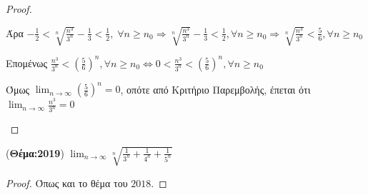 \begin{proof}
\begin{description}
                Άρα $ - \frac{1}{2} < 
                \sqrt[n]{\frac{n^{3}}{3^{n}}} - \frac{1}{3} < \frac{1}{2}, \; 
                \forall n \geq n_{0} \Rightarrow \sqrt[n]{\frac{n^{3}}{3^{n}}} - 
                \frac{1}{3} < \frac{1}{2}, \forall n \geq n_{0} \Rightarrow 
                \sqrt[n]{\frac{n^{3}}{3^{n}}} < \frac{5}{6}, \forall n \geq n_{0} $ 

                Επομένως $ \frac{n^{3}}{3^{n}} < \left(\frac{5}{6}\right)^{n}, 
                \forall n \geq n_{0} \Leftrightarrow 0 <  \frac{n^{3}}{3^{n}} < 
                \left( \frac{5}{6}\right)^{n}, \forall n \geq n_{0}  $

                Όμως $ \lim_{n \to \infty} (\frac{5}{6} )^{n} = 0 $, οπότε 
                από Κριτήριο Παρεμβολής, έπεται ότι 
                $ \lim_{n \to \infty} \frac{n^{3}}{3^{n}} = 0 $
            \end{description}
          \end{proof}

        \item ({\bfseries Θέμα:2019}) $ \lim_{n \to \infty} \sqrt[n]{\frac{1}{3^{n}} + 
          \frac{1}{4^{n}} + \frac{1}{5^{n}}} $ 
          \begin{proof}
          \item {}
            Όπως και το θέμα του $ 2018 $.
          \end{proof}

